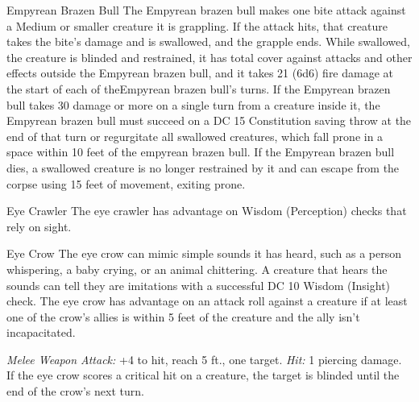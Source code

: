 \documentclass[10pt,a4paper,twoside,twocolumn,openany,bg=print,nodeprecatedcode]{dndbook}
\begin{document}
\begin{DndMonster}[float*=t]{Empyrean Brazen Bull}
The Empyrean brazen bull makes one bite attack against a Medium or smaller creature it is grappling. If the attack hits, that creature takes the bite's damage and is swallowed, and the grapple ends. While swallowed, the creature is blinded and restrained, it has total cover against attacks and other effects outside the Empyrean brazen bull, and it takes 21 (6d6) fire damage at the start of each of theEmpyrean brazen bull's turns. If the Empyrean brazen bull takes 30 damage or more on a single turn from a creature inside it, the Empyrean brazen bull must succeed on a DC 15 Constitution saving throw at the end of that turn or regurgitate all swallowed creatures, which fall prone in a space within 10 feet of the empyrean brazen bull. If the Empyrean brazen bull dies, a swallowed creature is no longer restrained by it and can escape from the corpse using 15 feet of movement, exiting prone.
\end{DndMonster}



\begin{DndMonster}[float*=t]{Eye Crawler}
\DndMonsterBasics[
armor-class = {11},
hit-points = {\DndDice{1d4}},
speed = {30 ft., 30 ft. (key)}
]
\DndMonsterAbilityScores[
 str = 3,
 dex = 13,
 con = 10,
 int = 6,
 wis = 11,
 cha = 5
]
\DndMonsterDetails[
skills = {Perception +2, Stealth +5},
senses = {darkvision 60 ft., passive perception 12},
challenge = 0,
]
The eye crawler has advantage on Wisdom (Perception) checks that rely on sight.
\end{DndMonster}


\clearpage

\begin{DndMonster}[float*=t]{Eye Crow}
\DndMonsterBasics[
armor-class = {12},
hit-points = {\DndDice{1d4}},
speed = {10 ft., 50 ft. (key)}
]
\DndMonsterAbilityScores[
 str = 2,
 dex = 14,
 con = 10,
 int = 3,
 wis = 12,
 cha = 7
]
\DndMonsterDetails[
skills = {Perception +3},
challenge = 0,
]
The eye crow can mimic simple sounds it has heard, such as a person whispering, a baby crying, or an animal chittering. A creature that hears the sounds can tell they are imitations with a successful DC 10 Wisdom (Insight) check.
The eye crow has advantage on an attack roll against a creature if at least one of the crow's allies is within 5 feet of the creature and the ally isn't incapacitated.
\par
{}
\textsl{Melee Weapon Attack:} +4 to hit, reach 5 ft., one target. \textsl{Hit:} 1 piercing damage. If the eye crow scores a critical hit on a creature, the target is blinded until the end of the crow's next turn.
\end{DndMonster}
\end{document}
